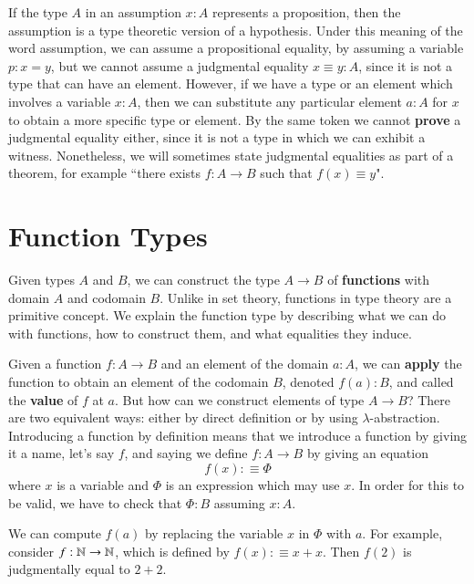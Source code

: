 If the type $A$ in an assumption $x:A$ represents a proposition, then the assumption is a type theoretic version of a hypothesis. Under this meaning of the word assumption, we can assume a propositional equality, by assuming a variable $p:x=y$, but we cannot assume a judgmental equality $x\equiv y:A$, since it is not a type that can have an element. However, if we have a type or an element which involves a variable $x:A$, then we can substitute any particular element $a:A$ for $x$ to obtain a more specific type or element. By the same token we cannot \textbf{prove} a judgmental equality either, since it is not a type in which we can exhibit a witness. Nonetheless, we will sometimes state judgmental equalities as part of a theorem, for example ``there exists $f:A\rightarrow B$ such that $f(x) \equiv y$".

\section{Function Types}

Given types $A$ and $B$, we can construct the type $A\rightarrow B$ of \textbf{functions} with domain $A$ and codomain $B$. Unlike in set theory, functions in type theory are a primitive concept. We explain the function type by describing what we can do with functions, how to construct them, and what equalities they induce.

Given a function $f:A\rightarrow B$ and an element of the domain $a: A$, we can \textbf{apply} the function to obtain an element of the codomain $B$, denoted $f(a):B$, and called the \textbf{value} of $f$ at $a$. But how can we construct elements of type $A\rightarrow B$? There are two equivalent ways: either by direct definition or by using $\lambda$-abstraction. Introducing a function by definition means that we introduce a function by giving it a name, let's say $f$, and saying we define $f:A\rightarrow B$ by giving an equation $$f(x) :\equiv \Phi$$ where $x$ is a variable and $\Phi$ is an expression which may use $x$. In order for this to be valid, we have to check that $\Phi:B$ assuming $x:A$.

We can compute $f(a)$ by replacing the variable $x$ in $\Phi$ with $a$. For example, consider $f:\mathbb N\rightarrow \mathbb N$, which is defined by $f(x):\equiv x+x$. Then $f(2)$ is judgmentally equal to $2+2$.

